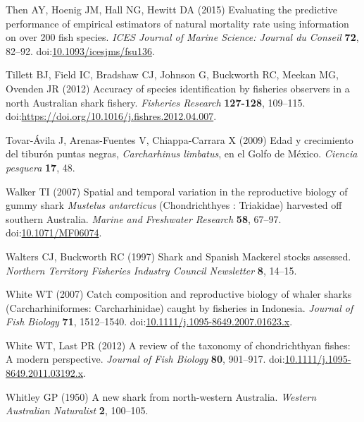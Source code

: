 \documentclass[]{article}
\begin{document}
\hypertarget{ref-then_evaluating_2015}{}
Then AY, Hoenig JM, Hall NG, Hewitt DA (2015) Evaluating the predictive
performance of empirical estimators of natural mortality rate using
information on over 200 fish species. \emph{ICES Journal of Marine
Science: Journal du Conseil} \textbf{72}, 82--92.
doi:\href{https://doi.org/10.1093/icesjms/fsu136}{10.1093/icesjms/fsu136}.

\hypertarget{ref-tillett_accuracy_2012}{}
Tillett BJ, Field IC, Bradshaw CJ, Johnson G, Buckworth RC, Meekan MG,
Ovenden JR (2012) Accuracy of species identification by fisheries
observers in a north Australian shark fishery. \emph{Fisheries Research}
\textbf{127-128}, 109--115.
doi:\href{https://doi.org/https://doi.org/10.1016/j.fishres.2012.04.007}{https://doi.org/10.1016/j.fishres.2012.04.007}.

\hypertarget{ref-tovar-avila_edad_2009}{}
Tovar-Ávila J, Arenas-Fuentes V, Chiappa-Carrara X (2009) Edad y
crecimiento del tiburón puntas negras, \emph{Carcharhinus limbatus}, en
el Golfo de México. \emph{Ciencia pesquera} \textbf{17}, 48.

\hypertarget{ref-walker_spatial_2007}{}
Walker TI (2007) Spatial and temporal variation in the reproductive
biology of gummy shark \emph{Mustelus antarcticus} (Chondrichthyes :
Triakidae) harvested off southern Australia. \emph{Marine and Freshwater
Research} \textbf{58}, 67--97.
doi:\href{https://doi.org/10.1071/MF06074}{10.1071/MF06074}.

\hypertarget{ref-walters_shark_1997}{}
Walters CJ, Buckworth RC (1997) Shark and Spanish Mackerel stocks
assessed. \emph{Northern Territory Fisheries Industry Council
Newsletter} \textbf{8}, 14--15.

\hypertarget{ref-white_catch_2007}{}
White WT (2007) Catch composition and reproductive biology of whaler
sharks (Carcharhiniformes: Carcharhinidae) caught by fisheries in
Indonesia. \emph{Journal of Fish Biology} \textbf{71}, 1512--1540.
doi:\href{https://doi.org/10.1111/j.1095-8649.2007.01623.x}{10.1111/j.1095-8649.2007.01623.x}.

\hypertarget{ref-white_review_2012}{}
White WT, Last PR (2012) A review of the taxonomy of chondrichthyan
fishes: A modern perspective. \emph{Journal of Fish Biology}
\textbf{80}, 901--917.
doi:\href{https://doi.org/10.1111/j.1095-8649.2011.03192.x}{10.1111/j.1095-8649.2011.03192.x}.

\hypertarget{ref-whitley_new_1950}{}
Whitley GP (1950) A new shark from north-western Australia.
\emph{Western Australian Naturalist} \textbf{2}, 100--105.
\end{document}
